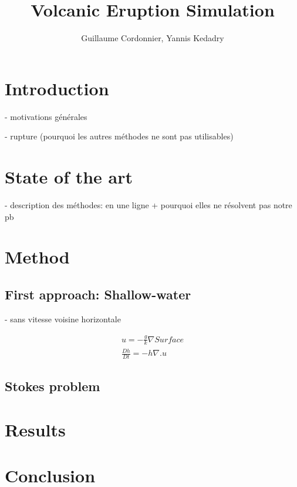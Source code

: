 \documentclass{article}
\title{Volcanic Eruption Simulation}
\author{Guillaume Cordonnier, Yannis Kedadry}
\date{}
\begin{document}
\maketitle

\begin{abstract}
\end{abstract}

\section*{Introduction}

- motivations générales

- rupture (pourquoi les autres méthodes ne sont pas utilisables)

\section*{State of the art}

- description des méthodes: en une ligne + pourquoi elles ne résolvent pas notre pb

\section*{Method}

\subsection*{First approach: Shallow-water}

- sans vitesse voisine horizontale

\begin{align}
    u = -\frac{g}{k}\nabla{Surface}\\
    \frac{Dh}{Dt} = -h\nabla.u
\end{align}

\subsection*{Stokes problem}

\section*{Results}

\section*{Conclusion}

\nocite{*}



\appendix

%
\end{document}
